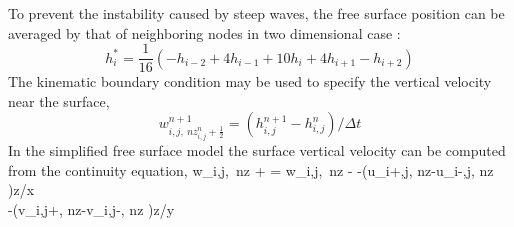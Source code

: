 To prevent the instability caused by steep waves, the free surface position can be averaged by that of neighboring nodes in two dimensional case \cite{Turnbull2003}:
\begin{equation}
h_i^*=\frac{1}{16}(-h_{i-2}+4h_{i-1}+10h_{i}+4h_{i+1}-h_{i+2})
\end{equation}
The kinematic boundary condition may be used to specify the vertical
velocity near the surface,
\begin{equation}
w_{i,j,\ nz_{i,j}^n + \frac{1}{2}} ^{n+1} = (h_{i,j}^{n+1}-h_{i,j}^{n})/ \Delta
t
\end{equation}
In the simplified free surface model the surface vertical velocity can be computed from the continuity equation,
\small \ba
w_{i,j,\ nz + } = w_{i,j,\ nz - }
-(u_{i+,j, nz}-u_{i-,j, nz} )\Delta z/\Delta x \nonumber \\
-(v_{i,j+, nz}-v_{i,j-, nz} )\Delta z/\Delta y
\ea
\normalsize
